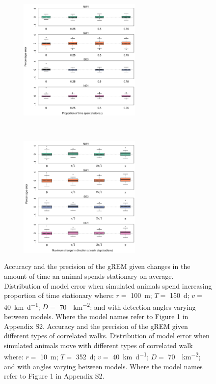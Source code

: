 \documentclass[a4paper,10pt,reqno,oneside]{amsart}
\begin{document}
\begin{figure}[t]
	\centering
	\begin{subfigure}[t]{60mm}
      		\centering
		\includegraphics[width=60mm]{imgs/ResultsPerch.pdf}
         	 \label{f:Perch}
		\caption{} 
	\end{subfigure}
	~
	\begin{subfigure}[t]{60mm}
                \centering
		\includegraphics[width=60mm]{imgs/ResultsTort.pdf}
                \label{f:Tort}
                \caption{} 
         \end{subfigure}
	\label{f:BreakAssump}
	\caption{
	Accuracy and the precision of the gREM given changes in the amount of time an animal spends stationary on average. Distribution of model error when simulated animals spend increasing proportion of time stationary where:  $r = $ \SI{100}{\meter}; $T = $ \SI{150}{\day}; $v = $ \SI{40}{\kilo\meter\per\day}; $D = $ \SI{70}{\animals\per\kilo\meter\squared}; and with detection angles varying between models. Where the model names refer to Figure 1 in Appendix S2. 
	Accuracy and the precision of the gREM given different types of correlated walks. Distribution of model error when simulated animals move with different types of correlated walk where:  $r = $ \SI{10}{\meter}; $T = $ \SI{352}{\day}; $v = $ \SI{40}{\kilo\meter\per\day}; $D = $ \SI{70}{\animals\per\kilo\meter\squared}; and with angles varying between models. Where the model names refer to Figure 1 in Appendix S2.} 
\end{figure}
\end{document}
